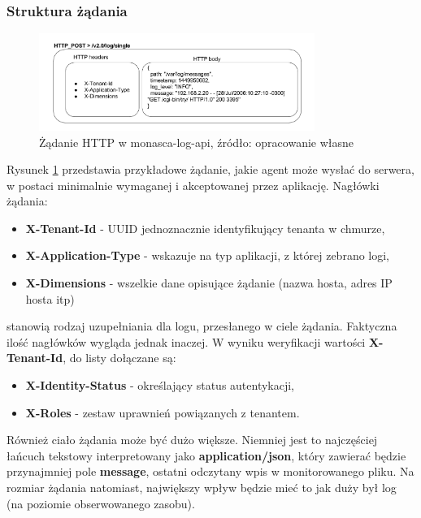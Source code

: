     \subsubsection{Struktura żądania}
    \begin{figure}[H]
        \centering
        \includegraphics[width=0.80\textwidth]{images/monasca_log_api_request}
        \caption[Żądanie HTTP w monasca-log-api]{
             Żądanie HTTP w monasca-log-api, źródło: opracowanie własne
        }
        \label{chapter:monasca:monasca_log_api:request}
    \end{figure}
    Rysunek \ref{chapter:monasca:monasca_log_api:request} przedstawia przykładowe
    żądanie, jakie agent może wysłać do serwera, w postaci minimalnie wymaganej
    i akceptowanej przez aplikację. Nagłówki żądania:
    \begin{itemize}
        \item \textbf{X-Tenant-Id} - UUID jednoznacznie identyfikujący tenanta w chmurze,
        \item \textbf{X-Application-Type} - wskazuje na typ aplikacji, z której zebrano logi,
        \item \textbf{X-Dimensions} - wszelkie dane opisujące żądanie (nazwa hosta, adres IP hosta itp) 
    \end{itemize}
    stanowią rodzaj uzupełniania dla logu, przesłanego w ciele żądania. Faktyczna ilość nagłówków wygląda 
    jednak inaczej. W wyniku weryfikacji wartości \textbf{X-Tenant-Id}, do listy dołączane są:
    \begin{itemize}
        \item \textbf{X-Identity-Status} - określający status autentykacji,
        \item \textbf{X-Roles} - zestaw uprawnień powiązanych z tenantem.
    \end{itemize}
    
    Również ciało żądania może być dużo większe. Niemniej jest to najczęściej łańcuch tekstowy
    interpretowany jako \textbf{application/json}, który zawierać będzie przynajmniej pole \textbf{message},
    ostatni odczytany wpis w monitorowanego pliku. Na rozmiar żądania natomiast, największy wpływ będzie mieć
    to jak duży był log (na poziomie obserwowanego zasobu). 
    
